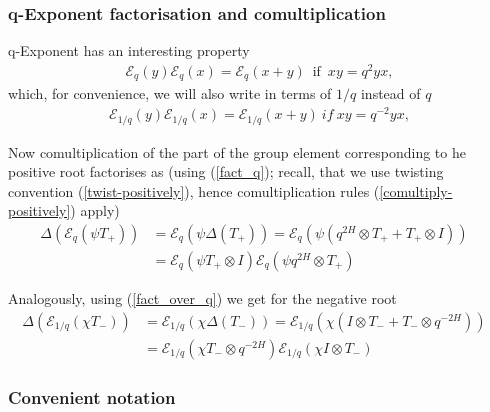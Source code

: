 \documentclass{article}
\newcommand{\lb}{\left (}
\newcommand{\rb}{\right )}
\newcommand{\lsb}{\left [}
\newcommand{\rsb}{\right ]}
\newcommand{\be}{\begin{eqnarray}}
\newcommand{\ee}{\end{eqnarray}}
\DeclareMathOperator{\If}{if}
\newcommand {\?}{\textit{???}}
\newcommand{\me}[0]{\mathcal{E}}
\def\dg{\Delta (g)}
\def\gog{g \otimes g}
\newcommand{\comul}[1]{\Delta \lb #1 \rb}
\newcommand{\delabel}[1]{(\ref{#1})}
\begin{document}


\subsubsection{q-Exponent factorisation and comultiplication}
q-Exponent has an interesting property
\be
\me_q(y)\me_q(x) = \me_q(x + y)\ \If \ xy = q^2 yx, \label{fact_q}
\ee
which, for convenience, we will also write in terms of $1/q$ instead of $q$
\be
\me_{1/q}(y)\me_{1/q}(x) = \me_{1/q}(x + y)\ if\ xy = q^{-2} yx, \label{fact_over_q}
\ee

Now comultiplication of the part of the group element corresponding to he positive root factorises as
(using \delabel{fact_q}; recall, that we use twisting convention \delabel{twist-positively}, hence
comultiplication rules \delabel{comultiply-positively} apply)
\be
\label{comul-expt-positive-sl2}
\comul{\me_q \lb \psi T_+ \rb} & = \me_q \lb \psi \comul{T_+}\rb = \me_q \lb \psi \lb q^{2H} \otimes T_+ + T_+ \otimes I \rb \rb & \\
& = \me_q \lb \psi T_+ \otimes I\rb \me_q \lb \psi q^{2H} \otimes T_+\rb \nonumber
\ee

Analogously, using (\ref{fact_over_q}) we get for the negative root
\be
\label{comul-expt-negative-sl2}
\comul{\me_{1/q} \lb \chi T_- \rb} & = \me_{1/q} \lb \chi \comul{T_-}\rb = \me_{1/q} \lb \chi \lb I \otimes T_- + T_- \otimes q^{-2H} \rb \rb & \\
& = \me_{1/q} \lb \chi T_- \otimes q^{-2H}\rb \me_{1/q} \lb \chi I \otimes T_-\rb \nonumber
\ee

\subsubsection{Convenient notation}
\end{document}

